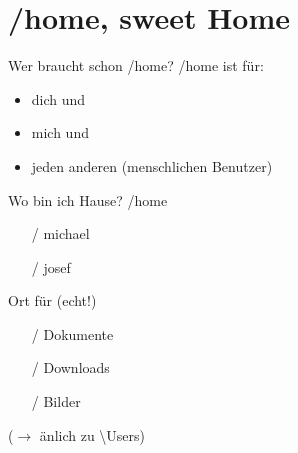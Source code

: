 \section[/home]{/home, sweet Home}
\begin{frame}{Wer braucht schon /home?}
/home ist für:
\begin{itemize}
 \item dich und
 \item mich und
 \item jeden anderen (menschlichen Benutzer)
\end{itemize}

\end{frame}

\begin{frame}{Wo bin ich Hause?}
/home
\begin{itemize}
  \item [/] michael
  \item [/] josef
\end{itemize}
\vfill
Ort für  {\small (echt!)}
\begin{itemize}
 \item [/] Dokumente
 \item [/] Downloads
 \item [/] Bilder
\end{itemize}
\vfill
($\longrightarrow$ änlich zu \textbackslash Users)

\vfill
\end{frame}